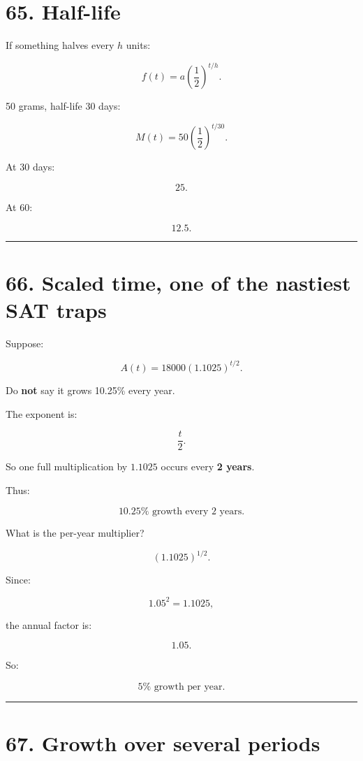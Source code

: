 \documentclass[
]{article}
\begin{document}
\section{65. Half-life}\label{half-life}

If something halves every \(h\) units:

\[
\boxed{f(t)=a\left(\frac12\right)^{t/h}}.
\]

50 grams, half-life 30 days:

\[
\boxed{M(t)=50\left(\frac12\right)^{t/30}}.
\]

At 30 days:

\[
25.
\]

At 60:

\[
12.5.
\]

\begin{center}\rule{0.5\linewidth}{0.5pt}\end{center}

\section{66. Scaled time, one of the nastiest SAT
traps}\label{scaled-time-one-of-the-nastiest-sat-traps}

Suppose:

\[
A(t)=18000(1.1025)^{t/2}.
\]

Do \textbf{not} say it grows 10.25\% every year.

The exponent is:

\[
\frac t2.
\]

So one full multiplication by \(1.1025\) occurs every \textbf{2 years}.

Thus:

\[
\boxed{10.25\%\text{ growth every 2 years}}.
\]

What is the per-year multiplier?

\[
(1.1025)^{1/2}.
\]

Since:

\[
1.05^2=1.1025,
\]

the annual factor is:

\[
1.05.
\]

So:

\[
\boxed{5\%\text{ growth per year}}.
\]

\begin{center}\rule{0.5\linewidth}{0.5pt}\end{center}

\section{67. Growth over several
periods}\label{growth-over-several-periods}
\end{document}
